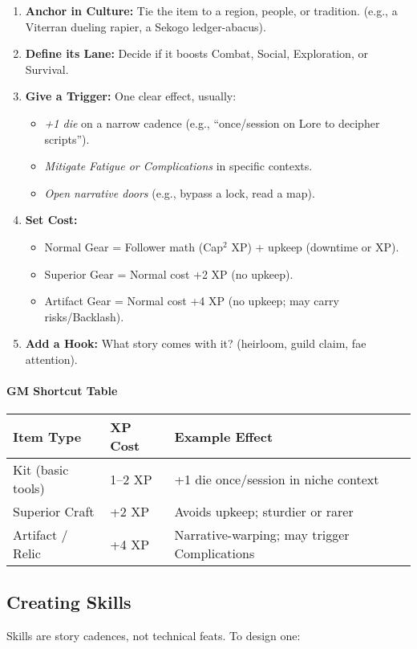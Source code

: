 \documentclass[12pt]{book}
\begin{document}
\begin{enumerate}
  \item \textbf{Anchor in Culture:} Tie the item to a region, people, or tradition. (e.g., a Viterran dueling rapier, a Sekogo ledger-abacus).
  \item \textbf{Define its Lane:} Decide if it boosts Combat, Social, Exploration, or Survival.
  \item \textbf{Give a Trigger:} One clear effect, usually:
    \begin{itemize}
      \item \emph{+1 die} on a narrow cadence (e.g., “once/session on Lore to decipher scripts”).
      \item \emph{Mitigate Fatigue or Complications} in specific contexts.
      \item \emph{Open narrative doors} (e.g., bypass a lock, read a map).
    \end{itemize}
  \item \textbf{Set Cost:}
    \begin{itemize}
      \item Normal Gear = Follower math (Cap$^2$ XP) + upkeep (downtime or XP).
      \item Superior Gear = Normal cost +2 XP (no upkeep).
      \item Artifact Gear = Normal cost +4 XP (no upkeep; may carry risks/Backlash).
    \end{itemize}
  \item \textbf{Add a Hook:} What story comes with it? (heirloom, guild claim, fae attention).
\end{enumerate}

\paragraph{GM Shortcut Table}
\begin{tabular}{@{}lll@{}}
\toprule
\textbf{Item Type} & \textbf{XP Cost} & \textbf{Example Effect} \\
\midrule
Kit (basic tools) & 1--2 XP & +1 die once/session in niche context \\
Superior Craft & +2 XP & Avoids upkeep; sturdier or rarer \\
Artifact / Relic & +4 XP & Narrative-warping; may trigger Complications \\
\bottomrule
\end{tabular}

\subsection*{Creating Skills}
Skills are story cadences, not technical feats.  
To design one:
\end{document}
